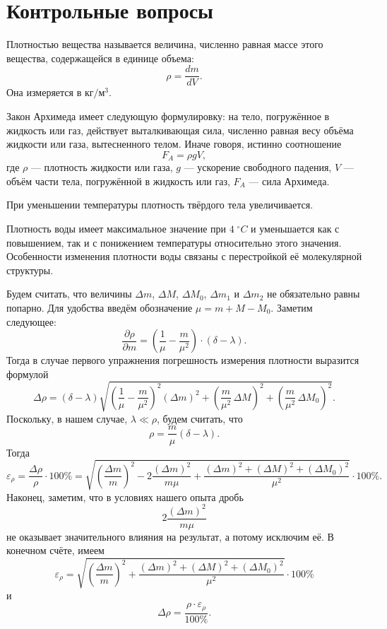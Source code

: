 \section{Контрольные вопросы}

\begin{Enumerate}
	\item Плотностью вещества называется величина, численно равная массе этого вещества, содержащейся в единице объема:
	\[
	\rho=\frac{dm}{dV}.
	\]
	Она измеряется в $\text{кг}/\text{м}^3$.
	
	\item Закон Архимеда имеет следующую формулировку: на тело, погружённое в жидкость или газ, действует выталкивающая сила, численно равная весу объёма жидкости или газа, вытесненного телом. Иначе говоря, истинно соотношение
	\[
	F_A=\rho gV,
	\]
	где $\rho$ --- плотность жидкости или газа, $g$ --- ускорение свободного падения, $V$ --- объём части тела, погружённой в жидкость или газ, $F_A$ --- сила Архимеда.
	
	\item При уменьшении температуры плотность твёрдого тела увеличивается.
	
	\item Плотность воды имеет максимальное значение при $4\;^\circ C$ и уменьшается как с повышением, так и с понижением температуры относительно этого значения. Особенности изменения плотности воды связаны с перестройкой её молекулярной структуры.
	
	\item Будем считать, что величины $\Delta m$, $\Delta M$, $\Delta M_0$, $\Delta m_1$ и $\Delta m_2$ не обязательно равны попарно. Для удобства введём обозначение $\mu=m+M-M_0$. Заметим следующее:
	\[
	\frac{\partial\rho}{\partial m}=\left(\frac{1}{\mu}-\frac{m}{\mu^2}\right)\cdot(\delta-\lambda).
	\]
	Тогда в случае первого упражнения погрешность измерения плотности выразится формулой
	\[
	\Delta\rho=(\delta-\lambda)\sqrt{\left(\frac{1}{\mu}-\frac{m}{\mu^2}\right)^2(\Delta m)^2+\left(\frac{m}{\mu^2}\,\Delta M\right)^2+\left(\frac{m}{\mu^2}\,\Delta M_0\right)^2}.
	\]
	Поскольку, в нашем случае, $\lambda\ll\rho$, будем считать, что
	\[
	\rho=\frac{m}{\mu}(\delta-\lambda).
	\]
	Тогда
	\[
	\varepsilon_\rho=\frac{\Delta\rho}{\rho}\cdot100\%=\sqrt{\left(\frac{\Delta m}{m}\right)^2-2\frac{(\Delta m)^2}{m\mu}+\frac{(\Delta m)^2+(\Delta M)^2+(\Delta M_0)^2}{\mu^2}}\cdot100\%. 
	\]
	Наконец, заметим, что в условиях нашего опыта дробь
	\[
	2\frac{(\Delta m)^2}{m\mu}
	\]
	не оказывает значительного влияния на результат, а потому исключим её. В конечном счёте, имеем
	\[
	\varepsilon_\rho=\sqrt{\left(\frac{\Delta m}{m}\right)^2+\frac{(\Delta m)^2+(\Delta M)^2+(\Delta M_0)^2}{\mu^2}}\cdot100\%
	\]
	и
	\[
	\Delta\rho=\frac{\rho\cdot\varepsilon_\rho}{100\%}.
	\]
	

\end{Enumerate}
